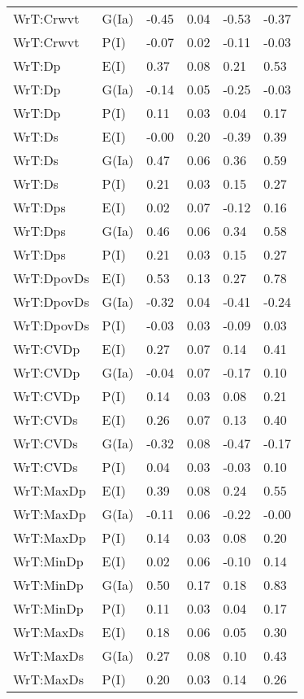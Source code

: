 \begin{center}
\begin{longtable}{|p{1.1in}|p{0.7in}|p{0.7in}|p{0.6in}|p{0.6in}|p{0.6in}|}
  WrT:Crwvt & G(Ia) & -0.45 & 0.04 & -0.53 & -0.37 \\ 
  WrT:Crwvt & P(I) & -0.07 & 0.02 & -0.11 & -0.03 \\ 
  WrT:Dp & E(I) & 0.37 & 0.08 & 0.21 & 0.53 \\ 
  WrT:Dp & G(Ia) & -0.14 & 0.05 & -0.25 & -0.03 \\ 
  WrT:Dp & P(I) & 0.11 & 0.03 & 0.04 & 0.17 \\ 
  WrT:Ds & E(I) & -0.00 & 0.20 & -0.39 & 0.39 \\ 
  WrT:Ds & G(Ia) & 0.47 & 0.06 & 0.36 & 0.59 \\ 
  WrT:Ds & P(I) & 0.21 & 0.03 & 0.15 & 0.27 \\ 
  WrT:Dps & E(I) & 0.02 & 0.07 & -0.12 & 0.16 \\ 
  WrT:Dps & G(Ia) & 0.46 & 0.06 & 0.34 & 0.58 \\ 
  WrT:Dps & P(I) & 0.21 & 0.03 & 0.15 & 0.27 \\ 
  WrT:DpovDs & E(I) & 0.53 & 0.13 & 0.27 & 0.78 \\ 
  WrT:DpovDs & G(Ia) & -0.32 & 0.04 & -0.41 & -0.24 \\ 
  WrT:DpovDs & P(I) & -0.03 & 0.03 & -0.09 & 0.03 \\ 
  WrT:CVDp & E(I) & 0.27 & 0.07 & 0.14 & 0.41 \\ 
  WrT:CVDp & G(Ia) & -0.04 & 0.07 & -0.17 & 0.10 \\ 
  WrT:CVDp & P(I) & 0.14 & 0.03 & 0.08 & 0.21 \\ 
  WrT:CVDs & E(I) & 0.26 & 0.07 & 0.13 & 0.40 \\ 
  WrT:CVDs & G(Ia) & -0.32 & 0.08 & -0.47 & -0.17 \\ 
  WrT:CVDs & P(I) & 0.04 & 0.03 & -0.03 & 0.10 \\ 
  WrT:MaxDp & E(I) & 0.39 & 0.08 & 0.24 & 0.55 \\ 
  WrT:MaxDp & G(Ia) & -0.11 & 0.06 & -0.22 & -0.00 \\ 
  WrT:MaxDp & P(I) & 0.14 & 0.03 & 0.08 & 0.20 \\ 
  WrT:MinDp & E(I) & 0.02 & 0.06 & -0.10 & 0.14 \\ 
  WrT:MinDp & G(Ia) & 0.50 & 0.17 & 0.18 & 0.83 \\ 
  WrT:MinDp & P(I) & 0.11 & 0.03 & 0.04 & 0.17 \\ 
  WrT:MaxDs & E(I) & 0.18 & 0.06 & 0.05 & 0.30 \\ 
  WrT:MaxDs & G(Ia) & 0.27 & 0.08 & 0.10 & 0.43 \\ 
  WrT:MaxDs & P(I) & 0.20 & 0.03 & 0.14 & 0.26 \\ 

\end{longtable}
\end{center}
